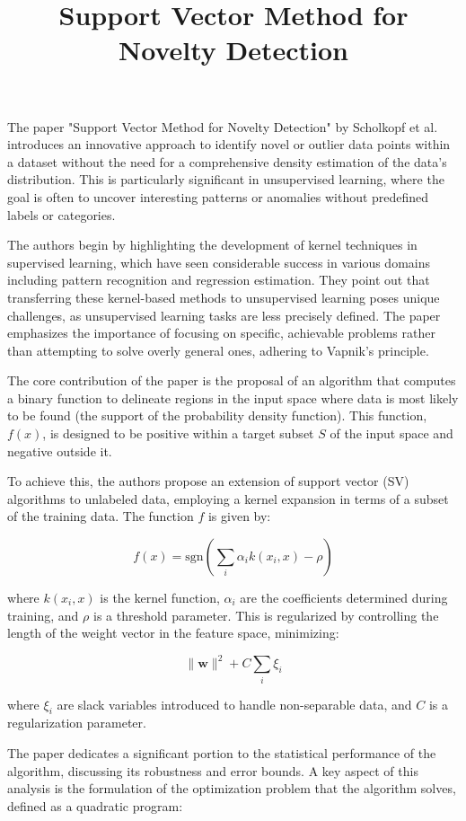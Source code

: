 \documentclass{article}
\title{Support Vector Method for Novelty Detection}
\date{}
\begin{document}
\maketitle

The paper "Support Vector Method for Novelty Detection" by Scholkopf et al. introduces an innovative approach to identify novel or outlier data points within a dataset without the need for a comprehensive density estimation of the data's distribution. This is particularly significant in unsupervised learning, where the goal is often to uncover interesting patterns or anomalies without predefined labels or categories.

The authors begin by highlighting the development of kernel techniques in supervised learning, which have seen considerable success in various domains including pattern recognition and regression estimation. They point out that transferring these kernel-based methods to unsupervised learning poses unique challenges, as unsupervised learning tasks are less precisely defined. The paper emphasizes the importance of focusing on specific, achievable problems rather than attempting to solve overly general ones, adhering to Vapnik's principle.

The core contribution of the paper is the proposal of an algorithm that computes a binary function to delineate regions in the input space where data is most likely to be found (the support of the probability density function). This function, \(f(x)\), is designed to be positive within a target subset \(S\) of the input space and negative outside it.

To achieve this, the authors propose an extension of support vector (SV) algorithms to unlabeled data, employing a kernel expansion in terms of a subset of the training data. The function \(f\) is given by:

\[ f(x) = \text{sgn}\left( \sum_{i} \alpha_i k(x_i, x) - \rho \right) \]

where \(k(x_i, x)\) is the kernel function, \(\alpha_i\) are the coefficients determined during training, and \(\rho\) is a threshold parameter. This is regularized by controlling the length of the weight vector in the feature space, minimizing:

\[ \|\mathbf{w}\|^2 + C \sum_{i} \xi_i \]

where \(\xi_i\) are slack variables introduced to handle non-separable data, and \(C\) is a regularization parameter.


The paper dedicates a significant portion to the statistical performance of the algorithm, discussing its robustness and error bounds. A key aspect of this analysis is the formulation of the optimization problem that the algorithm solves, defined as a quadratic program:
\end{document}
